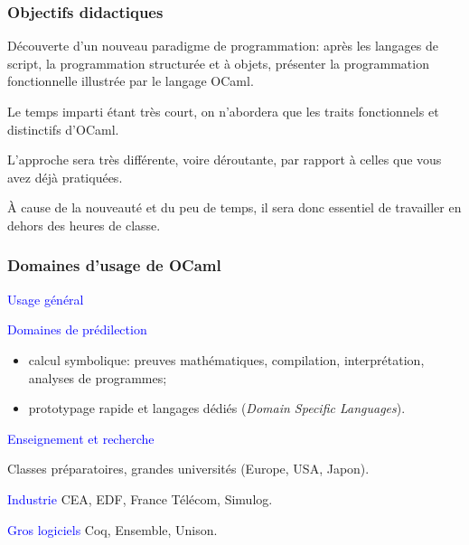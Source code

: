 
%
\begin{frame}
\frametitle{Objectifs didactiques}

Découverte d'un nouveau paradigme de programmation: après les langages
de script, la programmation structurée et à objets, présenter la
programmation fonctionnelle illustrée par le langage OCaml.

\bigskip

Le temps imparti étant très court, on n'abordera que les traits
fonctionnels et distinctifs d'OCaml.

\bigskip

L'approche sera très différente, voire déroutante, par rapport à
celles que vous avez déjà pratiquées.

\bigskip

À cause de la nouveauté et du peu de temps, il sera donc essentiel de
travailler en dehors des heures de classe.

\end{frame}

%
\begin{frame}
\frametitle{Domaines d'usage de OCaml}

\textcolor{blue}{Usage général}

\bigskip

\textcolor{blue}{Domaines de prédilection}

\begin{itemize}

  \item calcul symbolique: preuves mathématiques, compilation,
        interprétation, analyses de programmes;

  \item prototypage rapide et langages dédiés (\emph{Domain Specific
        Languages}).

\end{itemize}

\textcolor{blue}{Enseignement et recherche} 

Classes préparatoires, grandes universités (Europe, USA, Japon).

\bigskip

\textcolor{blue}{Industrie} CEA, EDF, France Télécom, Simulog.

\bigskip

\textcolor{blue}{Gros logiciels} Coq, Ensemble, Unison.

\end{frame}


